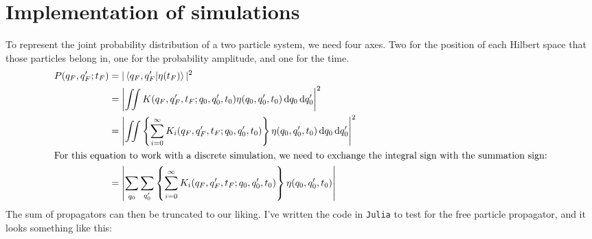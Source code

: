 \chapter{Implementation of simulations}

To represent the joint probability distribution of a two particle system, we need four axes. Two for the position of each Hilbert space that those particles belong in, one for the probability amplitude, and one for the time.
\begin{align}
    P(q_F, q_F'; t_F) &= |\braket{q_F, q_F'}{\eta(t_F)}|^2 \\
    &= \left|\iint K(q_F, q_F', t_F; q_0, q_0', t_0)\eta(q_0, q_0', t_0)\dd{q_0}\dd{q_0'}\right|^2 \\
    &= \left|\iint \left\{\sum_{i = 0}^{\infty}K_i(q_F, q_F', t_F; q_0, q_0', t_0)\right\}\eta(q_0, q_0', t_0)\dd{q_0}\dd{q_0'}\right|^2 \\
    \intertext{For this equation to work with a discrete simulation, we need to exchange the integral sign with the summation sign:}
    &= \left|\sum_{\vphantom{q_0'}q_0}\sum_{q_0'}\left\{\sum_{\vphantom{q_0'}i = 0}^{\infty}K_i(q_F, q_F', t_F; q_0, q_0', t_0)\right\}\eta(q_0, q_0', t_0)\right|
\end{align}
The sum of propagators can then be truncated to our liking. I've written the code in \texttt{Julia} to test for the free particle propagator, and it looks something like this:
